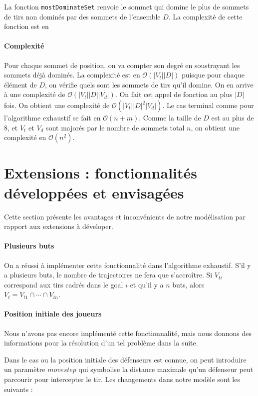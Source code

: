 \documentclass[12pt]{article}
\begin{document}
La fonction \texttt{mostDominateSet} renvoie le sommet qui domine le plus de sommets de tirs non dominés par des sommets de l'ensemble $D$. La complexité de cette fonction est en

\paragraph{Complexité} Pour chaque sommet de position, on va compter son degré en soustrayant les sommets déjà dominés. La complexité est en $\mathcal{O}(|V_t||D|)$ puisque pour chaque élément de $D$, on vérifie quels sont les sommets de tirs qu'il domine. On en arrive à une complexité de $\mathcal{O}(|V_t||D||V_d|)$. On fait cet appel de fonction au plus $|D|$ fois. On obtient une complexité de $\mathcal{O}(|V_t||D|^2|V_d|)$. Le cas terminal comme pour l'algorithme exhaustif se fait en $\mathcal{O}(n+m)$. Comme la taille de $D$ est au plus de 8, et $V_t$ et $V_d$ sont majorés par le nombre de sommets total $n$, on obtient une complexité en $\mathcal{O}(n^2)$.

\section{Extensions : fonctionnalités développées et envisagées}

Cette section présente les avantages et inconvénients de notre modélisation par rapport aux extensions à déveloper.

\paragraph{Plusieurs buts}
On a réussi à implémenter cette fonctionnalité dans l'algorithme exhaustif. S'il y a plusieurs buts, le nombre de trajectoires ne fera que s'accroître. Si $V_{ti}$ correspond aux tirs cadrés dans le goal $i$ et qu'il y a $n$ buts, alors $V_t = V_{t1} \cap \cdots \cap V_{tn}$.


\paragraph{Position initiale des joueurs} Nous n'avons pas encore implémenté cette fonctionnalité, mais nous donnons des informations pour la résolution d'un tel problème dans la suite.

Dans le cas ou la position initiale des défenseurs est connue, on peut introduire un paramètre $movestep$ qui symbolise la distance maximale qu'un défenseur peut parcourir pour intercepter le tir. Les changements dans notre modèle sont les suivants :
\end{document}

